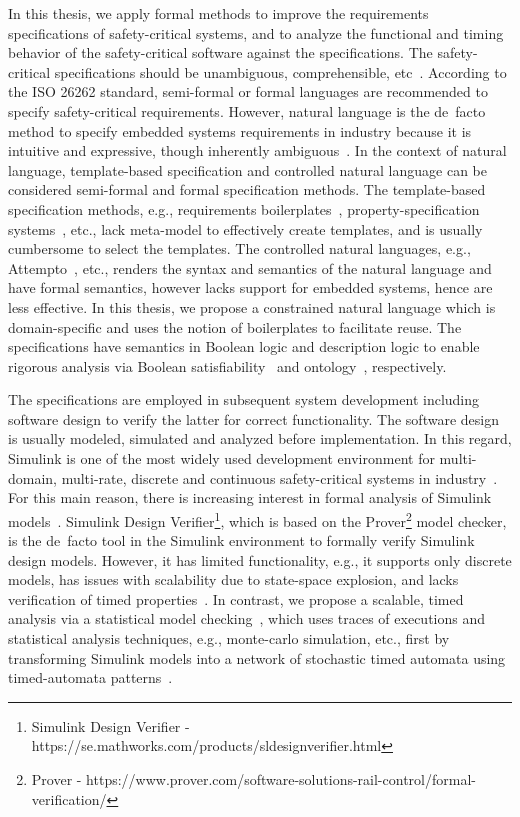 In this thesis, we apply formal methods to improve the requirements specifications of safety-critical systems, and to analyze the functional and timing behavior of the safety-critical software against the specifications. The safety-critical  specifications should be unambiguous, comprehensible, etc~\cite{ieereqspecstandard}. According to the ISO 26262 standard, semi-formal or formal languages are recommended to specify safety-critical requirements. However, natural language is the de~facto method to specify embedded systems requirements in industry because it is intuitive and expressive, though inherently ambiguous~\cite{ieereqspecstandard}. In the context of natural language, template-based specification and controlled natural language can be considered semi-formal and formal specification methods. The template-based specification methods, e.g., requirements boilerplates~\cite{Hull2011RequirementsEngineering}, property-specification systems~\cite{Dwyer1999PatternsVerificationb}, etc., lack meta-model to effectively create templates, and is usually cumbersome to select the templates. The controlled natural languages, e.g., Attempto~\cite{attempto96}\cite{Fuchs2008AttemptoRepresentation}, etc., renders the syntax and semantics of the natural language and have formal semantics, however lacks support for embedded systems, hence are less effective. In this thesis, we propose a constrained natural language which is domain-specific and uses the notion of boilerplates to facilitate reuse. The specifications have semantics in Boolean logic and description logic to enable rigorous analysis via Boolean satisfiability~\cite{Malik2009BooleanSuccess} and ontology~\cite{f25ea3c6f4b743cd90c150926bbcf3db}, respectively.

The specifications are employed in subsequent system development including software design to verify the latter for correct functionality. The software design is usually modeled, simulated and analyzed before implementation. In this regard, Simulink is one of the most widely used development environment for multi-domain, multi-rate, discrete and continuous safety-critical systems in industry~\cite{JamesB.Dabney2003MasteringSimulink}. For this main reason, there is increasing interest in formal analysis of Simulink models~\cite{Manamcheri2011AModels}. Simulink Design Verifier\footnote{Simulink Design Verifier - https://se.mathworks.com/products/sldesignverifier.html}, which is based on the Prover\footnote{Prover - https://www.prover.com/software-solutions-rail-control/formal-verification/} model checker, is the de~facto tool in the Simulink environment to formally verify Simulink design models. However, it has limited functionality, e.g., it supports only discrete models, has issues with scalability due to state-space explosion, and lacks verification of timed properties~\cite{Leitner2008SimulinkStudy}.  In contrast, we propose a scalable, timed analysis via a statistical model checking~\cite{Legay2010StatisticalOverview}, which uses traces of executions and statistical analysis techniques, e.g., monte-carlo simulation, etc., first by transforming Simulink models into a network of stochastic timed automata using timed-automata patterns~\cite{Filipovikj2018SimppaalModels}.

